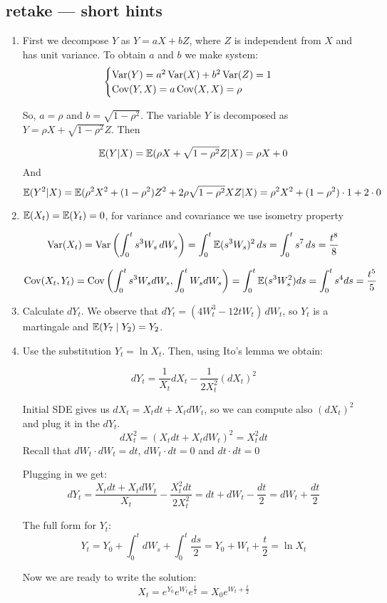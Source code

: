 \documentclass[12pt, a4paper]{article}
\begin{document}
\subsection{retake — short hints}
\begin{enumerate}
\item First we decompose $Y$ as $Y=aX+bZ$, where $Z$ is independent from $X$ and has unit variance. To obtain $a$ and $b$ we make system:
\[
\begin{cases}
\operatorname{Var}(Y)=a^2\operatorname{Var}(X)+b^2\operatorname{Var}(Z)=1 \\
\operatorname{Cov}(Y,X)=a\operatorname{Cov}(X,X)=\rho
\end{cases}
\]

So, $a=\rho$ and $b=\sqrt{1-\rho^2}$. The variable $Y$ is decomposed as $Y=\rho X + \sqrt{1-\rho^2}Z$. Then

\[
\mathbb{E}(Y|X)=\mathbb{E}(\rho X + \sqrt{1-\rho^2}Z | X)=\rho X + 0
\]
And
\[
\mathbb{E}(Y^2|X)=\mathbb{E}(\rho^2 X^2 + (1-\rho^2)Z^2 + 2 \rho \sqrt{1-\rho^2} XZ | X)=\rho^2 X^2 +  (1-\rho^2)\cdot 1 + 2\cdot 0
\]


\item $\mathbb{E}(X_t)=\mathbb{E}(Y_t)=0$, for variance and covariance we use isometry property

\[
\operatorname{Var}(X_{t})=\operatorname{Var}\left(\int_{0}^{t}s^{3}W_{s}\,dW_{s}\right)=\int_{0}^{t}\mathbb{E}(s^{3}W_{s})^{2}\,ds=\int_{0}^{t}s^{7}\,ds=\frac{t^{8}}{8}
\]

\[ \operatorname{Cov}(X_{t},Y_{t})=\operatorname{Cov}\left(\int_{0}^{t}s^{3}W_{s}dW_{s}, \int_{0}^{t}W_{s}dW_{s}\right)=\int_{0}^{t}\mathbb{E}(s^3W_{s}^{2})ds=\int_{0}^{t}s^{4}ds=\frac{t^{5}}{5}
\]

\item Calculate  $dY_t$. We observe that $dY_t=(4W_t^3 - 12t W_t) \, dW_t$, so $Y_t$ is a martingale and $\mathbb{E}(Y_7 \mid Y_2)=Y_2$.
\item Use the substitution $Y_t=\ln X_t$. Then, using Ito's lemma we obtain:

\[
dY_{t}=\frac{1}{X_{t}}dX_{t}-\frac{1}{2X_{t}^{2}}(dX_{t})^2
\]

Initial SDE gives us $dX_{t}=X_{t}dt+X_{t}dW_{t}$, so we can compute also $(dX_{t})^{2}$ and plug it in the $dY_{t}$.
\[
dX_{t}^{2}=(X_{t}dt+X_{t}dW_{t})^{2}=X_{t}^{2}dt
\]
Recall that $dW_{t}\cdot dW_{t}=dt$, $dW_{t}\cdot dt=0$ and $dt\cdot dt=0$

Plugging in we get:
\[ dY_{t}=\frac{X_{t}dt+X_{t}dW_{t}}{X_{t}}-\frac{X_{t}^{2}dt}{2X_{t}^{2}}=dt+dW_{t}-\frac{dt}{2}=dW_{t}+\frac{dt}{2}
\]

The full form for $Y_{t}$:
\[
Y_{t}=Y_{0}+\int_{0}^{t}dW_s+\int_{0}^{t}\frac{ds}{2}=Y_{0}+W_{t}+\frac{t}{2}=\ln{X_{t}}
\]

Now we are ready to write the solution:
\[
X_{t}=e^{Y_{0}}e^{W_{t}}e^{\frac{t}{2}}=X_{0}e^{W_{t}+\frac{t}{2}}
\]


\end{enumerate}
\end{document}
